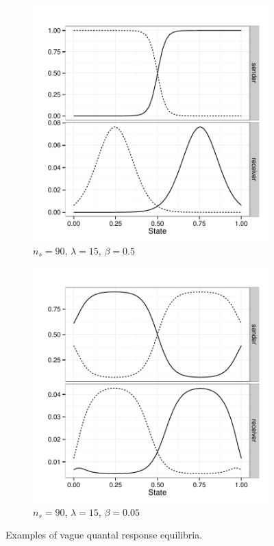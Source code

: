 \documentclass[fleqn,reqno,10pt]{article}
\newcommand{\toler}{\ensuremath{\beta}} %
\newcommand{\ns}{\ensuremath{n_s}} %
\begin{document}
\begin{figure}
  \centering
  
  \begin{subfigure}[]{0.45\textwidth}
    \includegraphics[width=\textwidth]{plots/exampleStratQRE_tolerance05.pdf}
    \caption{$\ns = 90$, $\lambda = 15$, $\toler = 0.5$}
    \label{fig:exampleQRE_stratsA}
  \end{subfigure}
  \hfill
  \begin{subfigure}[]{0.45\textwidth}
    \includegraphics[width=\textwidth]{plots/exampleStratQRE_tolerance005.pdf}
    \caption{$\ns = 90$, $\lambda = 15$, $\toler = 0.05$}
    \label{fig:exampleQRE_stratsB}
  \end{subfigure}

  \caption{Examples of vague quantal response equilibria.}
  \label{fig:exampleQREs}
\end{figure}
\end{document}
